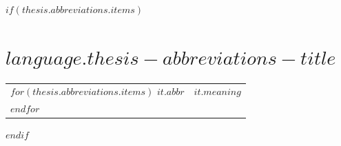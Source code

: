 $if(thesis.abbreviations.items)$
\thispagestyle{empty}
\chapter*{$language.thesis-abbreviations-title$}


\begin{tabular}{ll}
$for(thesis.abbreviations.items)$
\textbf{$it.abbr$} & $it.meaning$\\
$endfor$
\end{tabular}

\clearpage
$endif$

